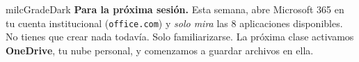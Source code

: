 \documentclass[11pt,letterpaper]{article}
\begin{document}
\begin{infoband}{milcGradeDark}
\textbf{Para la próxima sesión.} Esta semana, abre Microsoft 365 en tu cuenta institucional (\texttt{office.com}) y \emph{solo mira} las 8 aplicaciones disponibles. No tienes que crear nada todavía. Solo familiarizarse. La próxima clase activamos \textbf{OneDrive}, tu nube personal, y comenzamos a guardar archivos en ella.
\end{infoband}
\end{document}
